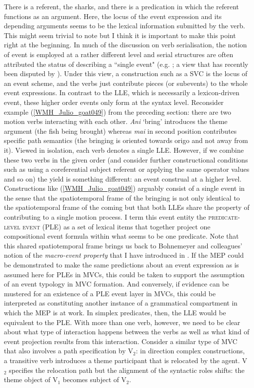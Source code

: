 \largerpage[1]
There is a referent, the sharks, and there is a predication in which the referent functions as an argument. Here, the locus of the event expression and its depending arguments seems to be the lexical information submitted by the verb. This might seem trivial to note but I think it is important to make this point right at the beginning. In much of the discussion on verb serialisation, the notion of event is employed at a rather different level and serial structures are often attributed the status of describing a ``single event" (e.g. \citealt{comrie1995serial, Aikhenvald2006}; a view that has recently been disputed by \citealt{baker2010complex}). Under this view, a construction such as a SVC is the locus of an event scheme, and the verbs just contribute pieces (or subevents) to the whole event expressions. In contrast to the LLE, which is necessarily a lexicon-driven event, these higher order events only form at the syntax level. Reconsider example (\ref{WMH_Julio_goat049}) from the preceding section: there are two motion verbs interacting with each other. \textit{Ani} `bring' introduces the theme argument (the fish being brought) whereas \textit{mai} in second position contributes specific path semantics (the bringing is oriented towards origo and not away from it). Viewed in isolation, each verb denotes a single LLE. However, if we combine these two verbs in the given order (and consider further constructional conditions such as using a coreferential subject referent or applying the same operator values and so on) the yield is something different: an event construal at a higher level. Constructions like (\ref{WMH_Julio_goat049}) arguably consist of a single event in the sense that the spatiotemporal frame of the bringing is not only identical to the spatiotemporal frame of the coming but that both LLEs share the property of contributing to a single motion process. I term this event entity the \textsc{predicate-level event} (PLE) as a set of lexical items that together project one compositional event formula within what seems to be one predicate. Note that this shared spatiotemporal frame brings us back to Bohnemeyer and colleagues' notion of the \textit{macro-event property} that I have introduced in . If the MEP could be demonstrated to make the same predictions about an event expression as is assumed here for PLEs in MVCs, this could be taken to support the assumption of an event typology in MVC formation. And conversely, if evidence can be mustered for an existence of a PLE event layer in MVCs, this could be interpreted as constituting another instance of a grammatical compartment in which the MEP is at work.
\newpage
In simplex predicates, then, the LLE would be equivalent to the PLE. With more than one verb, however, we need to be clear about what type of interaction happens between the verbs as well as what kind of event projection results from this interaction. Consider a similar type of MVC that also involves a path specification by V$_2$: in direction complex constructions, a transitive verb introduces a theme participant that is relocated by the agent. V$_2$ specifies the relocation path but the alignment of the syntactic roles shifts: the theme object of V$_1$ becomes subject of V$_2$.

